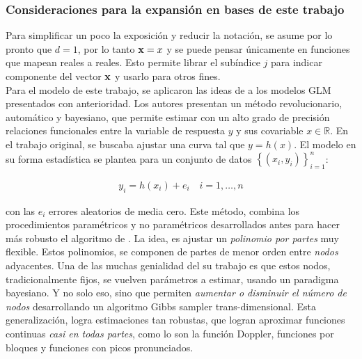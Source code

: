 \documentclass[../Main/Main.tex]{subfiles}
\begin{document}
\subsubsection{Consideraciones para la expansión en bases de este trabajo}
Para simplificar un poco la exposición y reducir la notación, se asume por lo pronto que $d = 1$, por lo tanto $\mathbf{x} = x$ y se puede pensar únicamente en funciones que mapean reales a reales. Esto permite librar el subíndice $j$ para indicar componente del vector $\mathbf{x}$ y usarlo para otros fines.\\

Para el modelo de este trabajo, se aplicaron las ideas de \autocite{mallik1998automatic} a los modelos GLM presentados con anterioridad. Los autores presentan un método revolucionario, automático y bayesiano, que permite estimar con un alto grado de precisión relaciones funcionales entre la variable de respuesta $y$ y sus covariable $x\in\mathbb{R}$. En el trabajo original, se buscaba ajustar una curva tal que $y = h(x)$. El modelo en su forma estadística se plantea para un conjunto de datos $\left\{(x_i,y_i) \right\}_{i = 1}^n$:

\begin{align}
	y_i = h(x_i) + e_i \quad i = 1,\ldots,n \label{ec:EstCurvas}
\end{align}

con las $e_i$ errores aleatorios de media cero. Este método, combina   los procedimientos paramétricos y no paramétricos desarrollados antes para hacer más robusto el algoritmo de \autocite{hastie1986generalized}. La idea, es ajustar un \textit{polinomio por partes} muy flexible. Estos polinomios, se componen de partes de menor orden entre \textit{nodos} adyacentes. Una de las muchas genialidad del su trabajo es que estos nodos, tradicionalmente fijos, se vuelven parámetros a estimar, usando un paradigma bayesiano. Y no solo eso, sino que permiten \textit{aumentar o disminuir el número de nodos} desarrollando un algoritmo Gibbs sampler trans-dimensional. Esta generalización, logra estimaciones tan robustas, que logran aproximar funciones continuas \textit{casi en todas partes}, como lo son la función Doppler, funciones por bloques y funciones con picos pronunciados. \\ 
\end{document}
